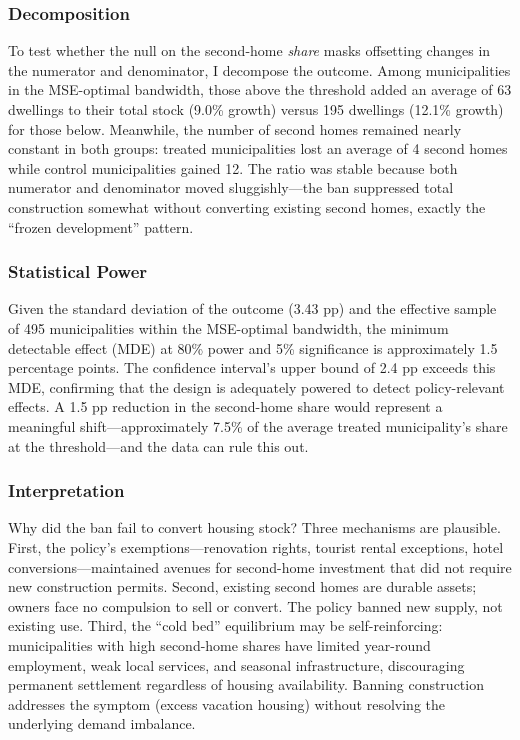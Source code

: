 \documentclass[12pt]{article}
\begin{document}


\subsubsection*{Decomposition} To test whether the null on the second-home \textit{share} masks offsetting changes in the numerator and denominator, I decompose the outcome. Among municipalities in the MSE-optimal bandwidth, those above the threshold added an average of 63 dwellings to their total stock (9.0\% growth) versus 195 dwellings (12.1\% growth) for those below. Meanwhile, the number of second homes remained nearly constant in both groups: treated municipalities lost an average of 4 second homes while control municipalities gained 12. The ratio was stable because both numerator and denominator moved sluggishly---the ban suppressed total construction somewhat without converting existing second homes, exactly the ``frozen development'' pattern.

\subsubsection*{Statistical Power} Given the standard deviation of the outcome (3.43 pp) and the effective sample of 495 municipalities within the MSE-optimal bandwidth, the minimum detectable effect (MDE) at 80\% power and 5\% significance is approximately 1.5 percentage points. The confidence interval's upper bound of 2.4 pp exceeds this MDE, confirming that the design is adequately powered to detect policy-relevant effects. A 1.5 pp reduction in the second-home share would represent a meaningful shift---approximately 7.5\% of the average treated municipality's share at the threshold---and the data can rule this out.

\subsubsection*{Interpretation} Why did the ban fail to convert housing stock? Three mechanisms are plausible. First, the policy's exemptions---renovation rights, tourist rental exceptions, hotel conversions---maintained avenues for second-home investment that did not require new construction permits. Second, existing second homes are durable assets; owners face no compulsion to sell or convert. The policy banned new supply, not existing use. Third, the ``cold bed'' equilibrium may be self-reinforcing: municipalities with high second-home shares have limited year-round employment, weak local services, and seasonal infrastructure, discouraging permanent settlement regardless of housing availability. Banning construction addresses the symptom (excess vacation housing) without resolving the underlying demand imbalance.
\end{document}
